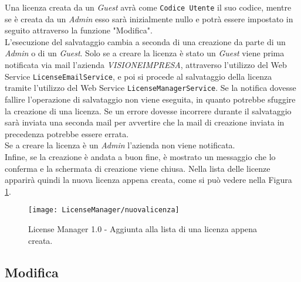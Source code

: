 Una licenza creata da un \textit{Guest} avrà come \texttt{Codice Utente} il suo codice, mentre se è creata da un \textit{Admin} esso sarà inizialmente nullo e potrà essere impostato in seguito attraverso la funzione "Modifica".
\\
L’esecuzione del salvataggio cambia a seconda di una creazione da parte di un \textit{Admin} o di un \textit{Guest}.
Solo se a creare la licenza è stato un \textit{Guest} viene prima notificata via mail l'azienda \textit{VISIONEIMPRESA}, attraverso l'utilizzo del Web Service \texttt{LicenseEmailService}, e poi si procede al salvataggio della licenza tramite l'utilizzo del Web Service \texttt{LicenseManagerService}. Se la notifica dovesse fallire l’operazione di salvataggio non viene eseguita, in quanto potrebbe sfuggire la creazione di una licenza. Se un errore dovesse incorrere durante il salvataggio sarà inviata una seconda mail per avvertire che la mail di creazione inviata in precedenza potrebbe essere errata.\\
Se a creare la licenza è un \textit{Admin} l'azienda non viene notificata.
\\
Infine, se la creazione è andata a buon fine, è mostrato un messaggio che lo conferma e la schermata di creazione viene chiusa. Nella lista delle licenze apparirà quindi la nuova licenza appena creata, come si può vedere nella Figura \ref{nuova}.

\begin{figure}[!h] 
    \centering 
    \texttt{[image: LicenseManager/nuovalicenza]} 
    \caption{License Manager 1.0 - Aggiunta alla lista di una licenza appena creata.}
\label{nuova}
\end{figure}


\subsection{Modifica}

